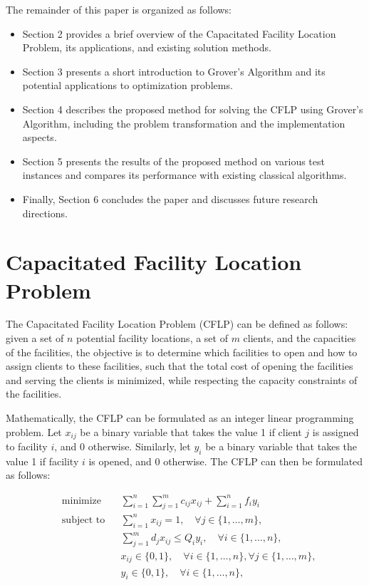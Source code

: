 The remainder of this paper is organized as follows:

\begin{itemize}
    \item Section 2 provides a brief overview of the Capacitated Facility Location Problem, its applications, and existing solution methods.
    \item Section 3 presents a short introduction to Grover's Algorithm and its potential applications to optimization problems.
    \item Section 4 describes the proposed method for solving the CFLP using Grover's Algorithm, including the problem transformation and the implementation aspects.
    \item Section 5 presents the results of the proposed method on various test instances and compares its performance with existing classical algorithms.
    \item Finally, Section 6 concludes the paper and discusses future research directions.
\end{itemize}

\section{Capacitated Facility Location Problem}

The Capacitated Facility Location Problem (CFLP) can be defined as follows: given a set of $n$ potential facility locations, a set of $m$ clients, and the capacities of the facilities, the objective is to determine which facilities to open and how to assign clients to these facilities, such that the total cost of opening the facilities and serving the clients is minimized, while respecting the capacity constraints of the facilities.

Mathematically, the CFLP can be formulated as an integer linear programming problem. Let $x_{ij}$ be a binary variable that takes the value 1 if client $j$ is assigned to facility $i$, and 0 otherwise. Similarly, let $y_i$ be a binary variable that takes the value 1 if facility $i$ is opened, and 0 otherwise. The CFLP can then be formulated as follows:

\begin{equation}
\begin{aligned}
& \text{minimize}
& & \sum_{i=1}^{n}\sum_{j=1}^{m} c_{ij}x_{ij} + \sum_{i=1}^{n} f_iy_i \\
& \text{subject to}
& & \sum_{i=1}^{n} x_{ij} = 1, \quad \forall j \in \{1, \ldots, m\}, \\
& & & \sum_{j=1}^{m} d_jx_{ij} \leq Q_iy_i, \quad \forall i \in \{1, \ldots, n\}, \\
& & & x_{ij} \in \{0,1\}, \quad \forall i \in \{1, \ldots, n\}, \forall j \in \{1, \ldots, m\}, \\
& & & y_i \in \{0,1\}, \quad \forall i \in \{1, \ldots, n\},
\end{aligned}
\end{equation}

